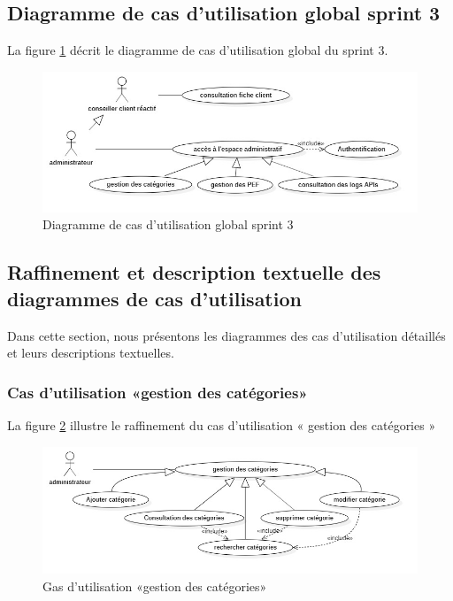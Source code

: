 \subsection{Diagramme de cas d’utilisation global sprint 3}
La figure \ref{fig:usecase-sprint3} décrit le diagramme de cas d’utilisation global du sprint 3.
\begin{figure}[H]
	\centering
	\includegraphics[width=0.58\linewidth]{"img/conception/usecases/sprint 3/UseCase-sprint3"}
	\caption[Diagramme de cas d’utilisation global sprint 3]{Diagramme de cas d’utilisation global sprint 3}
	\label{fig:usecase-sprint3}
\end{figure}

\subsection{Raffinement et description textuelle des diagrammes de cas d’utilisation}
Dans cette section, nous présentons les diagrammes des cas d’utilisation détaillés et leurs descriptions textuelles.\newpage
\subsubsection{Cas d’utilisation «gestion des catégories»}
La figure \ref{fig:usecase-gestion-categories} illustre le raffinement du cas d’utilisation « gestion des catégories »

\begin{figure}[H]
	\centering
	\includegraphics[width=0.7\linewidth]{"img/conception/usecases/sprint 3/usecase-gestion-categories"}
	\caption[Cas d’utilisation «gestion des catégories»]{Gas d’utilisation «gestion des catégories»}
	\label{fig:usecase-gestion-categories}
\end{figure}

